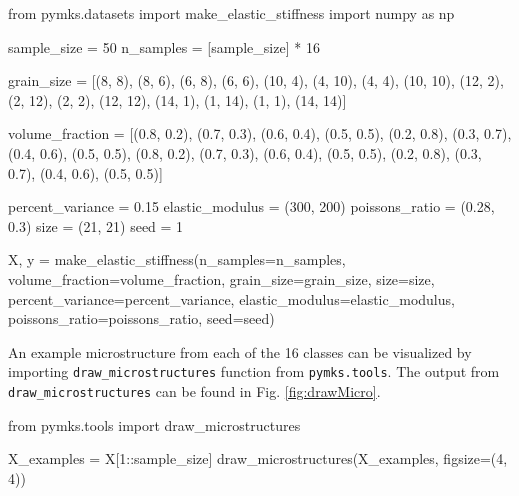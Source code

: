 \documentclass{bmcart}
\begin{document}
\begin{_input}
from pymks.datasets import make_elastic_stiffness
import numpy as np

sample_size = 50
n_samples = [sample_size] * 16

grain_size = [(8, 8), (8, 6), (6, 8), (6, 6),
              (10, 4), (4, 10), (4, 4), (10, 10),
              (12, 2), (2, 12), (2, 2), (12, 12),
              (14, 1), (1, 14), (1, 1), (14, 14)]

volume_fraction = [(0.8, 0.2), (0.7, 0.3), (0.6, 0.4), (0.5, 0.5),
                   (0.2, 0.8), (0.3, 0.7), (0.4, 0.6), (0.5, 0.5),
                   (0.8, 0.2), (0.7, 0.3), (0.6, 0.4), (0.5, 0.5),
                   (0.2, 0.8), (0.3, 0.7), (0.4, 0.6), (0.5, 0.5)]

percent_variance = 0.15 
elastic_modulus = (300, 200)
poissons_ratio = (0.28, 0.3)
size = (21, 21)
seed = 1

X, y = make_elastic_stiffness(n_samples=n_samples, 
                              volume_fraction=volume_fraction,
                              grain_size=grain_size,  size=size,
                              percent_variance=percent_variance,
                              elastic_modulus=elastic_modulus, 
                              poissons_ratio=poissons_ratio,
                              seed=seed)

\end{_input}

    An example microstructure from each of the 16 classes can be
visualized by importing \texttt{draw\_microstructures} function from
\texttt{pymks.tools}. The output from \texttt{draw\_microstructures}
can be found in Fig. \ref{fig:drawMicro}.


\begin{_input}
 from pymks.tools import draw_microstructures

X_examples = X[1::sample_size]
draw_microstructures(X_examples, figsize=(4, 4))

\end{_input}
\end{document}
